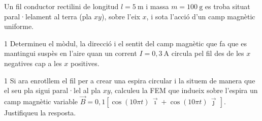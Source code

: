 Un fil conductor rectilini de longitud $l = 5\ \mathrm{m}$ i massa $m = 100\ \mathrm{g}$ es troba situat paral·lelament al terra (pla $xy$), sobre l'eix $x$, i sota l'acció d'un camp magnètic uniforme.

\begin{apartat}{1}
Determineu el mòdul, la direcció i el sentit del camp magnètic que fa que es mantingui suspès en l'aire quan un corrent $I = 0,3\ \mathrm{A}$ circula pel fil des de les $x$ negatives cap a les $x$ positives.
\end{apartat}

\begin{apartat}{1}
Si ara enrotllem el fil per a crear una espira circular i la situem de manera que el seu pla sigui paral·lel al pla $xy$, calculeu la FEM que indueix sobre l'espira un camp magnètic variable $\vec{B} = 0,1[\cos(10\pi t)\,\vec{\imath} + \cos(10\pi t)\,\vec{\jmath}\,]$. Justifiqueu la resposta.
\end{apartat}

